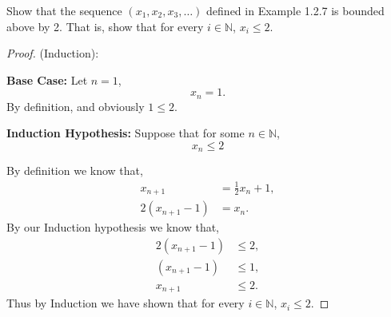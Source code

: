 \documentclass[12pt]{article}
\makeatletter
\theoremstyle{homework}
\newenvironment{exercise}[1]
{\def\@currentlabel{#1}\exercisecore}
{\endexercisecore}
\newcommand{\Nats}{\ensuremath{\mathbb N}}
\let\NN\Nats
\makeatother
\begin{document}
\begin{exercise}{[1.2 Supplement]} Show that the sequence $(x_1, x_2, x_3,\ldots)$ defined in Example
  1.2.7 is bounded above by 2.  That is, show that for every $i\in\Nats$, $x_i\le 2$.
  \end{exercise}
  \begin{proof} (Induction): 
    
    \textbf{Base Case:} Let $n = 1$,
    \begin{equation*}
      x_n = 1. 
    \end{equation*}
    By definition, and obviously $1 \le 2$.

    \textbf{Induction Hypothesis:}
    Suppose that for some $n \in \NN$, 
    \begin{equation*}
      x_n \le 2
    \end{equation*}

    By definition we know that,
    \begin{align*}
      x_{n+1} &= \frac{1}{2}x_n + 1,\\
      2(x_{n+1} - 1) &= x_n.
    \end{align*} 
    By our Induction hypothesis we know that,
    \begin{align*}
      2(x_{n+1} - 1) &\le 2,\\
      (x_{n+1} - 1) &\le 1,\\
      x_{n+1} &\le 2.
    \end{align*}
    Thus by Induction we have shown that for every $i\in\Nats$, $x_i\le 2$.





  \end{proof}  
\vspace{1in}
\end{document}
